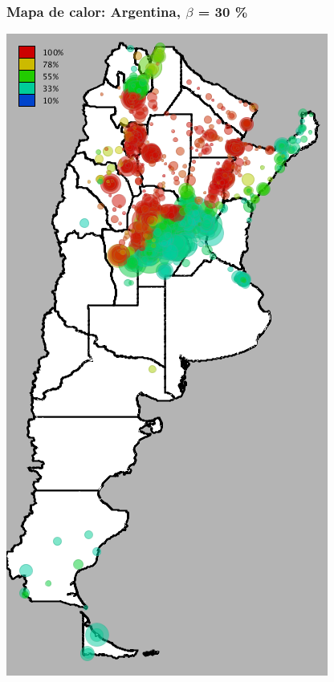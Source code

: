 \documentclass{beamer}
\begin{document}
\begin{frame}
	\frametitle{Mapa de calor: Argentina, $\beta$ = 30 \%}
	\center
	\includegraphics[height=.9\textheight,width = .9\columnwidth, keepaspectratio]
	{slides/201112_hi_res_argentina_usuarios_proporcion_circulos_beta30.png}
\end{frame}
\end{document}
